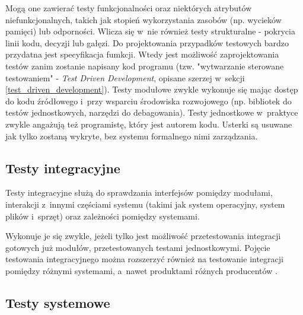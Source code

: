 Mogą one zawierać testy funkcjonalności oraz niektórych atrybutów niefunkcjonalnych, takich jak stopień wykorzystania zasobów (np. wycieków pamięci) lub odporności. Wlicza się w~nie również testy strukturalne - pokrycia linii kodu, decyzji lub gałęzi. Do projektowania przypadków testowych bardzo przydatna jest specyfikacja fumkcji. Wtedy jest możliwość zaprojektowania testów zanim zostanie napisany kod programu (tzw. "wytwarzanie sterowane testowaniem" - \textit{Test Driven Development}, opisane szerzej w~sekcji \ref{test_driven_development}). Testy modułowe zwykle wykonuje się mając dostęp do kodu źródłowego i~przy wsparciu środowiska rozwojowego (np. bibliotek do testów jednostkowych, narzędzi do debagowania). Testy jednostkowe w~praktyce zwykle angażują też programistę, który jest autorem kodu. Usterki są usuwane jak tylko zostaną wykryte, bez systemu formalnego nimi zarządzania.



\subsection{Testy integracyjne}

Testy integracyjne służą do sprawdzania interfejsów pomiędzy modułami, interakcji z~innymi częściami systemu (takimi jak system operacyjny, system plików i~sprzęt) oraz zależności pomiędzy systemami.

Wykonuje je się zwykle, jeżeli tylko jest możliwość przetestowania integracji gotowych już modułów, przetestowanych testami jednostkowymi. Pojęcie testowania integracyjnego można rozszerzyć również na testowanie integracji pomiędzy różnymi systemami, a~nawet produktami różnych producentów \cite{bib:sylabus:foundation}.

\subsection{Testy systemowe}

